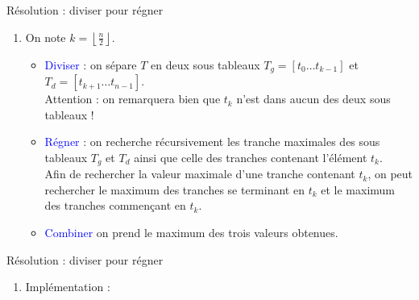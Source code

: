 \documentclass[10pt]{beamer}
\begin{document}
\begin{frame}[fragile]{\Ctitle}{\stitle}
	\begin{exampleblock}{Résolution : diviser pour régner}
		\begin{enumerate}
			\item<1-> On note $k = \left\lfloor \frac{n}{2} \right\rfloor$.
				\begin{itemize}
					\item<2-> \textcolor{blue}{Diviser} : on sépare $T$ en deux sous tableaux $T_g = [t_0 \dots t_{k-1}]$ et $T_d = [t_{k+1}\dots t_{n-1}]$. \\
						\textcolor{BrickRed}{\small \danger} Attention : on remarquera bien que $t_k$ n'est dans aucun des deux sous tableaux !
					\item<3-> \textcolor{blue}{Régner} : on recherche récursivement les tranche maximales des sous tableaux $T_g$ et $T_d$ ainsi que celle des tranches contenant l'élément $t_k$.\\
						Afin de rechercher la valeur maximale d'une tranche contenant $t_k$, on peut rechercher le maximum des tranches se terminant en $t_k$ et le maximum des tranches commençant en $t_k$.
					\item<4-> \textcolor{blue}{Combiner} on prend le maximum des trois valeurs obtenues.
				\end{itemize}
		\end{enumerate}
	\end{exampleblock}
\end{frame}

\begin{frame}[fragile]{\Ctitle}{\stitle}
	\begin{exampleblock}{Résolution : diviser pour régner}
		\begin{enumerate}
			\addtocounter{enumi}{1}
			\item<2-> Implémentation :
		\end{enumerate}
	\end{exampleblock}
\end{frame}
\end{document}
